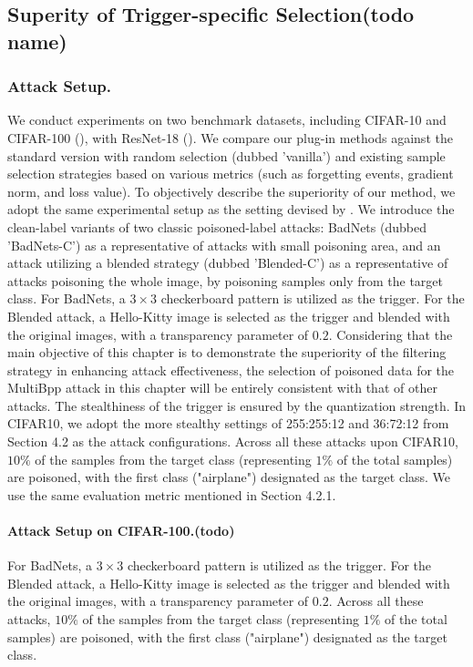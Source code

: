 \documentclass{article}
\begin{document}
\subsection{Superity of Trigger-specific Selection(todo name)}
\subsubsection{Attack Setup.}
We conduct experiments on two benchmark datasets, including CIFAR-10 and CIFAR-100 (\cite{krizhevsky2009learning}), with ResNet-18 (\cite{he2016deep}). We compare our plug-in methods against the standard version with random selection (dubbed 'vanilla') and existing sample selection strategies based on various metrics (such as forgetting events, gradient norm, and loss value). To objectively describe the superiority of our method, we adopt the same experimental setup as the setting devised by \citet{gao2023not}. We introduce the clean-label variants of two classic poisoned-label attacks: BadNets (dubbed 'BadNets-C') as a representative of attacks with small poisoning area, and an attack utilizing a blended strategy (dubbed 'Blended-C') as a representative of attacks poisoning the whole image, by poisoning samples only from the target class. For BadNets, a \(3 \times 3\) checkerboard pattern is utilized as the trigger. For the Blended attack, a Hello-Kitty image is selected as the trigger and blended with the original images, with a transparency parameter of \(0.2\). Considering that the main objective of this chapter is to demonstrate the superiority of the filtering strategy in enhancing attack effectiveness, the selection of poisoned data for the MultiBpp attack in this chapter will be entirely consistent with that of other attacks. The stealthiness of the trigger is ensured by the quantization strength. In CIFAR10, we adopt the more stealthy settings of 255:255:12 and 36:72:12 from Section 4.2 as the attack configurations. Across all these attacks upon CIFAR10, \(10\%\) of the samples from the target class (representing \(1\%\) of the total samples) are poisoned, with the first class ("airplane") designated as the target class. We use the same evaluation metric mentioned in Section 4.2.1.
\paragraph{Attack Setup on CIFAR-100.(todo)}
For BadNets, a \(3 × 3\) checkerboard pattern is utilized as the trigger. For the Blended attack, a Hello-Kitty image is selected as the trigger and blended with the original images, with a transparency parameter of \(0.2\). Across all these attacks, \(10\%\) of the samples from the target class (representing \(1\%\) of the total samples) are poisoned, with the first class ("airplane") designated as the target class.
\end{document}
